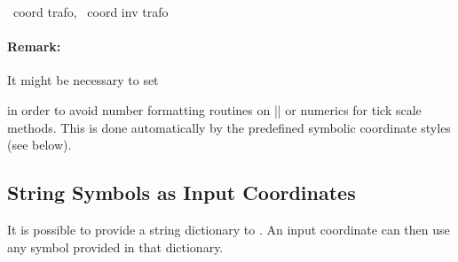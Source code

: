 \begin{pgfplotsxycodekeylist}{
	\x\ coord trafo,
	\x\ coord inv trafo}
	\paragraph{Remark:} It might be necessary to set
\begin{codeexample}
\end{codeexample}
	\noindent in order to avoid number formatting routines on |\tick| or numerics for tick scale methods. This is done automatically by the predefined symbolic coordinate styles (see below).
\end{pgfplotsxycodekeylist}

\subsection{String Symbols as Input Coordinates}
It is possible to provide a string dictionary to \PGFPlots. An input coordinate can then use any symbol provided in that dictionary.
